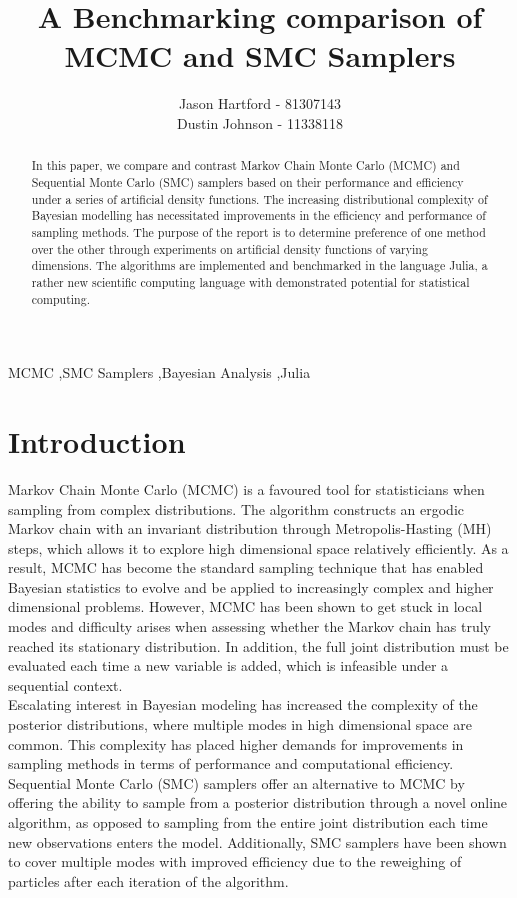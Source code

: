 \documentclass[12pt]{elsarticle}
\begin{document}
	
\begin{frontmatter}
\title{A Benchmarking comparison of MCMC and SMC Samplers}
\author{Jason Hartford - 81307143 \\ Dustin Johnson - 11338118}

\begin{abstract}
In this paper, we compare and contrast Markov Chain Monte Carlo (MCMC) and Sequential Monte Carlo (SMC) samplers based on their performance and efficiency under a series of artificial density functions. The increasing distributional complexity of Bayesian modelling has necessitated improvements in the efficiency and performance of sampling methods.  The purpose of the report is to determine preference of one method over the other through experiments on artificial density functions of varying dimensions. The algorithms are implemented and benchmarked in the language Julia, a rather new scientific computing language with demonstrated potential for statistical computing.
\end{abstract}

\begin{keyword}
MCMC \sep SMC Samplers \sep Bayesian Analysis \sep Julia
\end{keyword}

\end{frontmatter}



\section*{Introduction}
Markov Chain Monte Carlo (MCMC) is a favoured tool for statisticians when sampling from complex distributions. The algorithm constructs an ergodic Markov chain with an invariant distribution through Metropolis-Hasting (MH) steps, which allows it to explore high dimensional space relatively efficiently. As a result, MCMC has become the standard sampling technique that has enabled Bayesian statistics to evolve and be applied to increasingly complex and higher dimensional problems. However, MCMC has been shown to get stuck in local modes and difficulty arises when assessing whether the Markov chain has truly reached its stationary distribution. In addition, the full joint distribution must be evaluated each time a new variable is added, which is infeasible under a sequential context. \\

Escalating interest in Bayesian modeling has increased the complexity of the posterior distributions, where multiple modes in high dimensional space are common. This complexity has placed higher demands for improvements in sampling methods in terms of performance and computational efficiency. Sequential Monte Carlo (SMC) samplers offer an alternative to MCMC by offering the ability to sample from a posterior distribution through a novel online algorithm, as opposed to sampling from the entire joint distribution each time new observations enters the model.  Additionally, SMC samplers have been shown to cover multiple modes with improved efficiency due to the reweighing of particles after each iteration of the algorithm. \\
\end{document}
